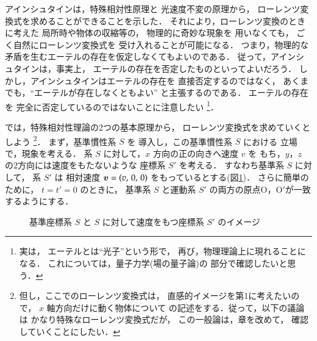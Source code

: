 アインシュタインは，特殊相対性原理と
光速度不変の原理から，
ローレンツ変換式を求めることができることを示した．
それにより，ローレンツ変換のときに考えた
局所時や物体の収縮等の，
物理的に奇妙な現象を
用いなくても，
ごく自然にローレンツ変換式を
受け入れることが可能になる．
つまり，物理的な矛盾を生むエーテルの存在を仮定しなくてもよいのである．
従って，アインシュタインは，事実上，
エーテルの存在を否定したものといってよいだろう．
しかし，アインシュタインはエーテルの存在を
直接否定するのではなく，
あくまでも，“エーテルが存在しなくともよい”
と主張するのである．
エーテルの存在を
完全に否定しているのではないことに注意したい
\footnote{
実は，
エーテルとは“光子”という形で，
再び，物理理論上に現れることになる．
これについては，量子力学(場の量子論)の
部分で確認したいと思う．
}．

では，特殊相対性理論の2つの基本原理から，
ローレンツ変換式を求めていくとしよう
\footnote{
但し，ここでのローレンツ変換式は，
直感的イメージを第1に考えたいので，
$x$ 軸方向だけに動く物体について
の記述をする．従って，以下の議論は
かなり特殊なローレンツ変換式だが，
この一般論は，章を改めて，
確認していくことにしたい．
}．
まず，基準慣性系 $S$ を
導入し，この基準慣性系 $S$ における
立場で，現象を考える．
系 $S$ に対して，$x$ 方向の正の向きへ速度 $v$ を
もち，$y$，$z$ の2方向には速度をもたないような
座標系 $S'$ を考える．
すなわち基準系 $S$ に対して，
系 $S'$ は
相対速度 $\boldsymbol{v}
=(v,\,0,\,0)$ をもっているとする(図\ref{fig:L_rt1})．
さらに簡単のために，
$t=t'=0$ のときに，
基準系 $S$ と運動系 $S'$ の両方の原点O，O$'$が一致するようにする．
                \begin{figure}[hbt]
                    \begin{center}
                        \caption{基準座標系 $S$ と $S$ に対して速度をもつ座標系 $S'$ のイメージ}
                        \label{fig:L_rt1}
                    \end{center}
                \end{figure}



